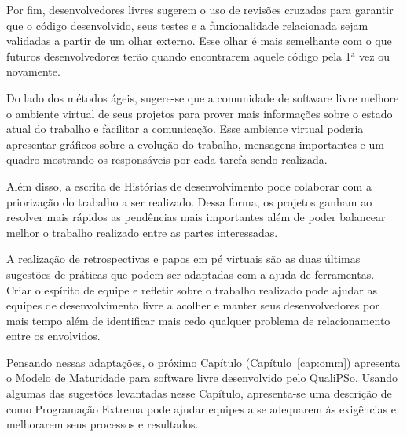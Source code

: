 Por fim, desenvolvedores livres sugerem o uso de revisões cruzadas
para garantir que o código desenvolvido, seus testes e a
funcionalidade relacionada sejam validadas a partir de um olhar
externo. Esse olhar é mais semelhante com o que futuros
desenvolvedores terão quando encontrarem aquele código pela
1$^\textrm{a}$ vez ou novamente.

Do lado dos métodos ágeis, sugere-se que a comunidade de software
livre melhore o ambiente virtual de seus projetos para prover mais
informações sobre o estado atual do trabalho e facilitar a
comunicação. Esse ambiente virtual poderia apresentar gráficos sobre a
evolução do trabalho, mensagens importantes e um quadro mostrando os
responsáveis por cada tarefa sendo realizada.

Além disso, a escrita de Histórias de desenvolvimento pode colaborar
com a priorização do trabalho a ser realizado. Dessa forma, os
projetos ganham ao resolver mais rápidos as pendências mais
importantes além de poder balancear melhor o trabalho realizado entre
as partes interessadas.

A realização de retrospectivas e papos em pé virtuais são as duas
últimas sugestões de práticas que podem ser adaptadas com a ajuda de
ferramentas. Criar o espírito de equipe e refletir sobre o trabalho
realizado pode ajudar as equipes de desenvolvimento livre a acolher e
manter seus desenvolvedores por mais tempo além de identificar mais
cedo qualquer problema de relacionamento entre os envolvidos.

Pensando nessas adaptações, o próximo Capítulo
(Capítulo~\ref{cap:omm}) apresenta o Modelo de Maturidade para
software livre desenvolvido pelo QualiPSo. Usando algumas das
sugestões levantadas nesse Capítulo, apresenta-se uma descrição de
como Programação Extrema pode ajudar equipes a se adequarem às
exigências e melhorarem seus processos e resultados.

